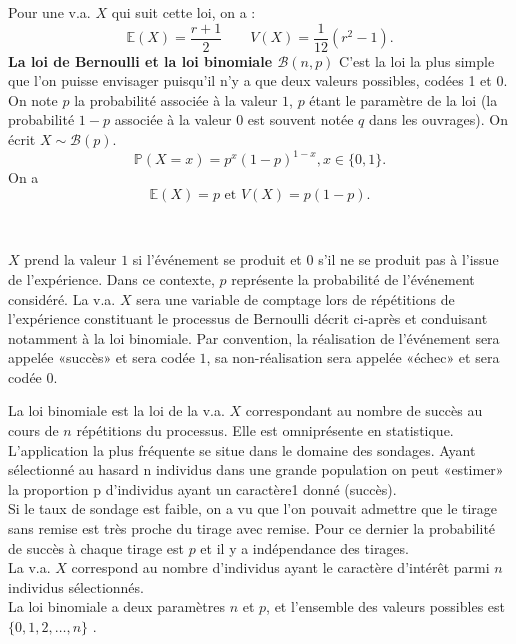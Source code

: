 \documentclass[../PolyS4.tex]{subfiles}
\begin{document}
Pour une v.a. $X$ qui suit cette loi, on a :
$$\mathbb{E}(X) =\dfrac{r + 1}{2} \qquad 
V (X) =\dfrac{1}{12}(r^2 - 1) .$$
\textbf{ La loi de Bernoulli et la loi binomiale $\mathcal{B}(n,p)$}
C'est la loi la plus simple que l'on puisse envisager puisqu'il n'y a que deux valeurs possibles, codées 1 et 0.\\
 On note $p$ la probabilité associée à la valeur $1$, $p$ étant le paramètre de la loi (la probabilité $1-p$ associée à la valeur $0$ est souvent notée $q$ dans les ouvrages). On
écrit $X \sim \mathcal{B}(p)$.\\
$$\mathbb{P}(X = x) = p^x(1 - p)^{1-x} , x \in \{0, 1\}.$$
On a $$\mathbb{E}(X) = p \text{ et } V (X) = p(1 - p).$$

\begin{Rmq}$\,$

$X$ prend la valeur $1$ si l'événement se produit et $0$ s'il ne se produit pas à l'issue de l'expérience. Dans ce contexte, $p$ représente la probabilité de l'événement considéré. La v.a. $X$ sera une variable de comptage lors de répétitions de l'expérience constituant le processus de Bernoulli décrit ci-après et conduisant notamment à la loi binomiale. Par convention, la réalisation de l'événement sera appelée «succès» et sera codée $1$, sa non-réalisation sera appelée «échec» et sera codée $0$.
\end{Rmq}


La loi binomiale est la loi de la v.a. $X$ correspondant au nombre de succès au cours de $n$ répétitions du processus. Elle est omniprésente en statistique.
L'application la plus fréquente se situe dans le domaine des sondages. Ayant
sélectionné au hasard n individus dans une grande population  on peut «estimer» la proportion p d'individus ayant un caractère1 donné (succès).\\
 Si le taux de sondage est faible, on a vu que l'on pouvait admettre que le tirage sans remise est très proche du tirage avec remise. Pour ce dernier la probabilité de succès à chaque tirage est $p$
et il y a indépendance des tirages.\\
 La v.a. $X$ correspond au nombre d'individus ayant le caractère d'intérêt parmi $n$ individus sélectionnés.\\
La loi binomiale a deux paramètres $n$ et $p$, et l'ensemble des valeurs possibles
est $\{0, 1, 2,\dots, n\}$ . \\
\end{document}
